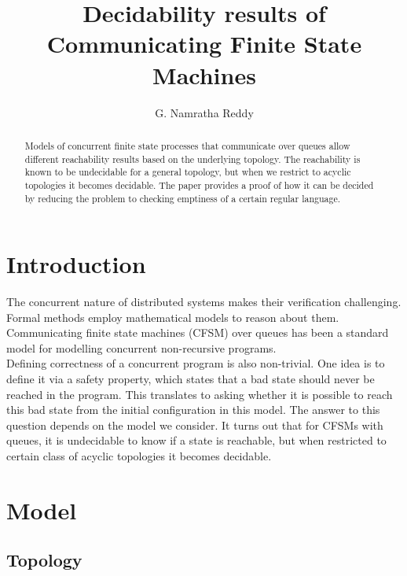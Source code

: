 \documentclass[a4paper,UKenglish,cleveref, autoref, thm-restate]{lipics-v2019}
\title{Decidability results of Communicating Finite
State Machines} %
\author{G. Namratha Reddy}{Chennai Mathematical Institute, India \and  \url{http://www.cmi.ac.in/~namratha} }{}{}{}
\begin{document}
\maketitle

\begin{abstract}
    Models of concurrent finite state processes that communicate over queues allow different reachability results based on the underlying topology. The reachability is known to be undecidable for a general topology, but when we restrict to acyclic topologies it becomes decidable. The paper provides a proof of how it can be decided by reducing the problem to checking emptiness of a certain regular language. 
\end{abstract}

\section{Introduction}
\label{sec:typesetting-summary}

\hspace*{0.5cm}The concurrent nature of distributed systems makes their verification challenging. Formal methods employ mathematical models to reason about them. Communicating finite state machines (CFSM)  over queues has been a standard model for modelling concurrent non-recursive programs. \\
\hspace*{0.5cm}Defining correctness of a concurrent program is also non-trivial. One idea is to define it via a safety property, which states that a bad state should never be reached in the program. This translates to asking whether it is possible to reach this bad state from the initial configuration in this model. The answer to this question depends on the model we consider. It turns out that for CFSMs with queues, it is undecidable to know if a state is reachable, but when restricted to certain class of acyclic topologies it becomes decidable.


\section{Model}

\subsection{Topology}
\end{document}
